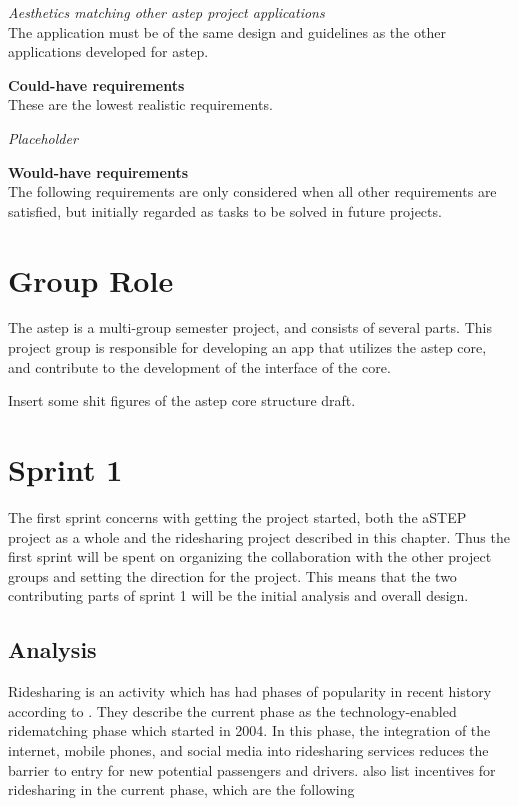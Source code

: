 \textit{Aesthetics matching other \gls{astep} project applications}\\
The application must be of the same design and guidelines as the other applications developed for \gls{astep}.

\textbf{Could-have requirements}\\
These are the lowest realistic requirements. 

\textit{Placeholder}\\

\textbf{Would-have requirements}\\
The following requirements are only considered when all other requirements are satisfied, but initially regarded as tasks to be solved in future projects.



\chapter{Group Role}
The \gls{astep} is a multi-group semester project, and consists of several parts. This project group is responsible for developing an app that utilizes the \gls{astep} core, and contribute to the development of the interface of the core.

Insert some shit figures of the \gls{astep} core structure draft.

\chapter{Sprint 1}
The first sprint concerns with getting the project started, both the aSTEP project as a whole and the ridesharing project described in this chapter.
Thus the first sprint will be spent on organizing the collaboration with the other project groups and setting the direction for the project.
This means that the two contributing parts of sprint 1 will be the initial analysis and overall design.
\section{Analysis}
Ridesharing is an activity which has had phases of popularity in recent history according to \citet{doi:10.1080/01441647.2011.621557}.
They describe the current phase as the technology-enabled ridematching phase which started in 2004.
In this phase, the integration of the internet, mobile phones, and social media into ridesharing services reduces the barrier to entry for new potential passengers and drivers.
\citet{doi:10.1080/01441647.2011.621557} also list incentives for ridesharing in the current phase, which are the following 

